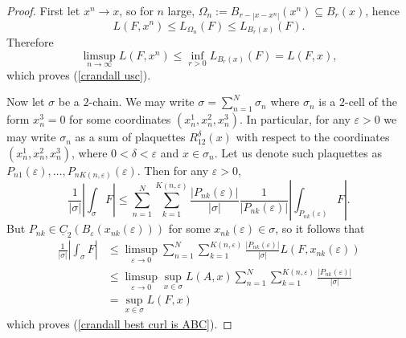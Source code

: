 \documentclass[reqno,11pt]{amsart}
\newcommand*\dif{\mathop{}\!\mathrm{d}}
\newcommand{\Chain}{\underline C}
\theoremstyle{definition}
\numberwithin{equation}{section}
\begin{document}
\begin{proof}
First let $x^n \to x$, so for $n$ large, $\Omega_n := B_{r - |x - x^n|}(x^n) \subseteq B_r(x)$, hence
$$L(F, x^n) \leq L_{\Omega_n}(F) \leq L_{B_r(x)}(F).$$
Therefore 
$$\limsup_{n \to \infty} L(F, x^n) \leq \inf_{r > 0} L_{B_r(x)}(F) = L(F, x),$$
which proves (\ref{crandall usc}).
	

Now let $\sigma$ be a $2$-chain.
We may write $\sigma = \sum_{n=1}^N \sigma_n$ where $\sigma_n$ is a $2$-cell of the form $x^3_n = 0$ for some coordinates $(x^1_n, x^2_n, x^3_n)$.
In particular, for any $\varepsilon > 0$ we may write $\sigma_n$ as a sum of plaquettes $R_{12}^\delta(x)$ with respect to the coordinates $(x^1_n, x^2_n, x^3_n)$, where $0 < \delta < \varepsilon$ and $x \in \sigma_n$.
Let us denote such plaquettes as $P_{n1}(\varepsilon), \dots, P_{nK(n, \varepsilon)}(\varepsilon)$. Then for any $\varepsilon > 0$, 
$$\frac{1}{|\sigma|} \left|\int_\sigma F\right| \leq \sum_{n=1}^N \sum_{k=1}^{K(n, \varepsilon)} \frac{|P_{nk}(\varepsilon)|}{|\sigma|} \frac{1}{|P_{nk}(\varepsilon)|} \left|\int_{P_{nk}(\varepsilon)} F\right|.$$
But $P_{nk} \in \Chain_2(B_\varepsilon(x_{nk}(\varepsilon)))$ for some $x_{nk}(\varepsilon) \in \sigma$, so it follows that 
\begin{align*}
\frac{1}{|\sigma|} \left|\int_\sigma F\right|
&\leq \limsup_{\varepsilon \to 0} \sum_{n=1}^N \sum_{k=1}^{K(n, \varepsilon)} \frac{|P_{nk}(\varepsilon)|}{|\sigma|} L(F, x_{nk}(\varepsilon)) \\
&\leq \limsup_{\varepsilon \to 0} \sup_{x \in \sigma} L(A, x)  \sum_{n=1}^N \sum_{k=1}^{K(n, \varepsilon)} \frac{|P_{nk}(\varepsilon)|}{|\sigma|} \\
&= \sup_{x \in \sigma} L(F, x)
\end{align*}
which proves (\ref{crandall best curl is ABC}).


\end{proof}
\end{document}

